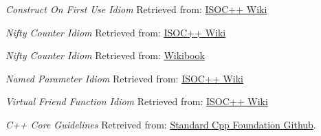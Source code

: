     \emph{Construct On First Use Idiom}
    \newline
    Retrieved from: \href{https://isocpp.org/wiki/faq/ctors#static-init-order-on-first-use}{ISOC++ Wiki}

    \emph{Nifty Counter Idiom}
    \newline
    Retrieved from: \href{https://isocpp.org/wiki/faq/ctors#nifty-counter-idiom}{ISOC++ Wiki}

    \emph{Nifty Counter Idiom}
    \newline
    Retrieved from: \href{https://en.wikibooks.org/wiki/More_C%2B%2B_Idioms/Nifty_Counter}{Wikibook}

    \emph{Named Parameter Idiom}
    \newline
    Retrieved from: \href{https://isocpp.org/wiki/faq/ctors#named-parameter-idiom}{ISOC++ Wiki}

    \emph{Virtual Friend Function Idiom}
    \newline
    Retrieved from: \href{https://isocpp.org/wiki/faq/input-output#virtual-friend-fns}{ISOC++ Wiki}

     \emph{C++ Core Guidelines}
    \newline
    Retreived from: \href{https://github.com/isocpp/CppCoreGuidelines/tree/master}{Standard Cpp Foundation Github}.    
    
    
